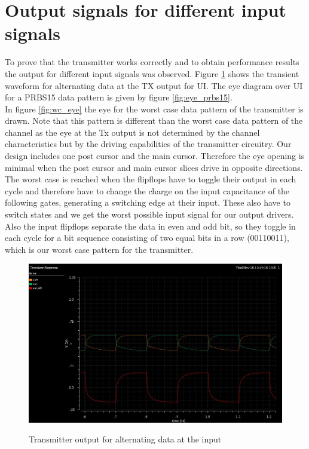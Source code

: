 \section{Output signals for different input signals}

To prove that the transmitter works correctly and to obtain performance results the output for different input signals was observed. Figure \ref{fig:alternating_data} shows the transient waveform for alternating data at the TX output for \unit[6]{UI}. The eye diagram over \unit[10000]{UI} for a PRBS15 data pattern is given by figure \ref{fig:eye_prbs15}.\\
In figure \ref{fig:wc_eye} the eye for the worst case data pattern of the transmitter is drawn. Note that this pattern is different than the worst case data pattern of the channel as the eye at the Tx output is not determined by the channel characteristics but by the driving capabilities of the transmitter circuitry. Our design includes one post cursor and the main cursor. Therefore the eye opening is minimal when the post cursor and main cursor slices drive in opposite directions. The worst case is reached when the flipflops have to toggle their output in each cycle and therefore have to change the charge on the input capacitance of the following gates, generating a switching edge at their input. These also have to switch states and we get the worst possible input signal for our output drivers. Also the input flipflops separate the data in even and odd bit, so they toggle in each cycle for a bit sequence consisting of two equal bits in a row (00110011), which is our worst case pattern for the transmitter.

\begin{figure}[ht]
  \centering
  {\includegraphics[scale=0.6]{img/alternating_data.jpg}}
  \caption{Transmitter output for alternating data at the input}
  \label{fig:alternating_data}
\end{figure}

